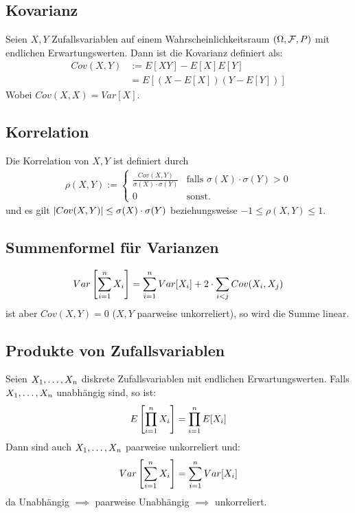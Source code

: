 \subsection*{Kovarianz}
Seien $X, Y$ Zufallsvariablen auf einem Wahrscheinlichkeitsraum $ (\Omega, \mathcal{F},
  P)$ mit endlichen Erwartungswerten. Dann ist die Kovarianz definiert als:
\begin{align*}
  Cov (X, Y) & := E[XY] - E[X]E[Y]          \\
             & = E[ (X - E[X])  (Y - E[Y])]
\end{align*}
Wobei $Cov (X, X) = Var[X]$.
\subsection*{Korrelation}
Die Korrelation von $X, Y$ ist definiert durch
\begin{align*}
  \rho (X, Y) := \begin{cases}
                   \frac{Cov (X, Y)}{\sigma (X) \cdot \sigma (Y)} & \text{falls } \sigma (X) \cdot \sigma (Y) > 0 \\
                   0                                              & \text{sonst.}
                 \end{cases}
\end{align*}
und es gilt $\abs{Cov (X, Y)} \leq \sigma (X) \cdot \sigma (Y)$
beziehungsweise $-1 \leq \rho (X, Y) \leq 1$.
\subsection*{Summenformel für Varianzen}
\begin{align*}
  Var \left[ \sum_{i = 1}^n X_i \right] = \sum_{i = 1}^n Var[X_i] + 2 \cdot \sum_{i < j} Cov (X_i, X_j)
\end{align*}
ist aber $Cov (X, Y) = 0$  ($X, Y$ paarweise unkorreliert), so wird
die Summe linear.
\subsection*{Produkte von Zufallsvariablen}
Seien $X_1, \dots, X_n$ diskrete Zufallsvariablen mit endlichen
Erwartungswerten. Falls $X_1, \dots, X_n$ unabhängig sind, so ist:
\begin{align*}
  E \left[ \prod_{i = 1}^n X_i \right] = \prod_{i = 1}^n E[X_i]
\end{align*}
Dann sind auch $X_1, \dots, X_n$ paarweise unkorreliert und:
\begin{align*}
  Var \left[ \sum_{i = 1}^n X_i \right] = \sum_{i = 1}^n Var[X_i]
\end{align*}
da Unabhängig $\implies$ paarweise Unabhängig $\implies$ unkorreliert.
